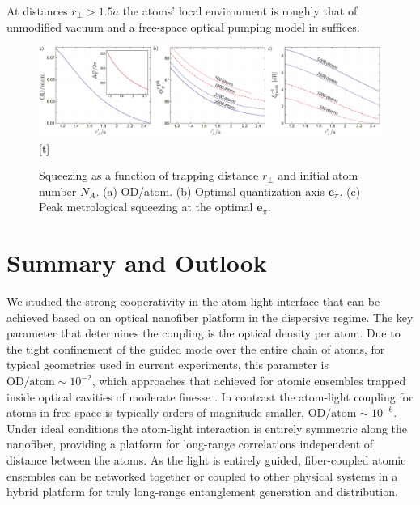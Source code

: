 \documentclass[aps,pra,twocolumn]{revtex4-1} %
\newcommand{\qaxis}{\mathbf{e}_\pi}
\newcommand{\comment}[1]{{\color{Maroon} #1}}
\begin{document}
At distances \comment{$r_\perp > 1.5a$} the atoms' local environment is roughly that of unmodified vacuum \cite{le_kien_spontaneous_2005} and a free-space optical pumping model in  suffices. 


\begin{figure}\includegraphics[scale=0.4]{./Figs/Fig_SqueezingDistance}[t]
\caption{Squeezing as a function of trapping distance $r_\perp$ and initial atom number $N_A$. (a) OD/atom. (b) Optimal quantization axis $\qaxis$. 
(c) Peak metrological squeezing at the optimal $\qaxis$.} \label{Fig::Squeezing_Distance}
\end{figure}


\section{Summary and Outlook} \label{Sec::Conclusion}

We studied the strong cooperativity in the atom-light interface that can be achieved based on an optical nanofiber platform in the dispersive regime.  
The key parameter that determines the coupling is the optical density per atom.  
Due to the tight confinement of the guided mode over the entire chain of atoms, for typical geometries used in current experiments, this parameter is $ \mathrm{OD}/\mathrm{atom}\sim 10^{-2} $, which approaches that achieved for atomic ensembles trapped inside optical cavities of moderate finesse \cite{chen_conditional_2011, zhang_collective_2012}.  
In contrast the atom-light coupling for atoms in free space is typically orders of magnitude smaller, $ \mathrm{OD}/\mathrm{atom} \sim 10^{-6}$.  
Under ideal conditions the atom-light interaction is entirely symmetric along the nanofiber, providing a platform for long-range correlations independent of distance between the atoms. 
As the light is entirely guided, fiber-coupled atomic ensembles can be networked together or coupled to other physical systems in a hybrid platform \cite{hafezi_atomic_2012, liebermeister_tapered_2014} for truly long-range entanglement generation and distribution. 
\end{document}
